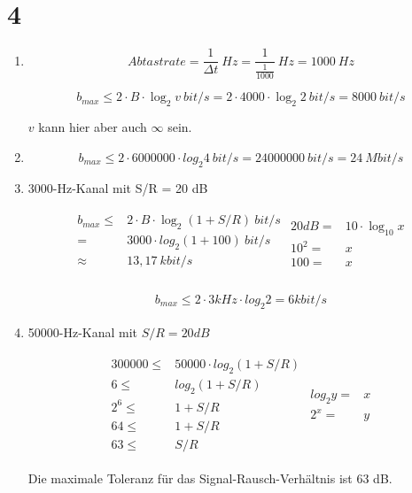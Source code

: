 \documentclass[ngerman]{scrartcl}
\begin{document}
\section*{4}

\begin{enumerate}[label=\alph*)]
  \item
  \[
    Abtastrate = \frac{1}{\Delta t}\ Hz = \frac{1}{\frac{1}{1000}}\ Hz = 1000\ Hz
  \]

  \[
    b_{max} \leq 2 \cdot B \cdot \log_{2}{v}\ bit/s
      =
    2 \cdot 4000 \cdot \log_{2}{2}\ bit/s
      =
    8000\ bit/s
  \]

  $v$ kann hier aber auch $\infty$ sein.
  \item
  \[
    b_{max} \leq 2 \cdot 6000000 \cdot log_{2}{4}\ bit/s
      =
    24000000\ bit/s
      =
    24\ Mbit/s
  \]
  \item
  3000-Hz-Kanal mit S/R = 20 dB

  \begin{align*}
    \begin{split}
      b_{max} \leq{}& 2 \cdot B \cdot \log_{2}{(1 + S/R)}\ bit/s\\
                 ={}& 3000 \cdot log_{2}{(1 + 100)}\ bit/s\\
           \approx{}& 13,17\ kbit/s\\
    \end{split}
    \begin{split}
      20 dB ={}& 10 \cdot \log_{10}{x}\\
       10^2 ={}& x\\
        100 ={}& x
    \end{split}
  \end{align*}


  \begin{align*}
    b_{max} \leq 2 \cdot 3 kHz \cdot log_{2}{2} = 6 kbit/s
  \end{align*}


  \item
  50000-Hz-Kanal mit $S/R = 20 dB$

  \begin{align*}
    \begin{split}
      300000 \leq{}& 50000 \cdot log_{2}{(1 + S/R)}\\
           6 \leq{}& log_{2}{(1 + S/R)}\\
         2^6 \leq{}& 1 + S/R\\
          64 \leq{}& 1 + S/R\\
          63 \leq{}& S/R
    \end{split}
    \begin{split}
      log_{2}{y} ={}& x\\
           2^{x} ={}& y
    \end{split}
  \end{align*}

  Die maximale Toleranz für das Signal-Rausch-Verhältnis ist 63 dB.
\end{enumerate}
\end{document}

